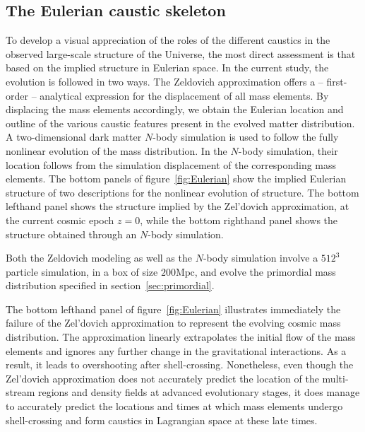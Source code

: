 \documentclass[a4paper, 11pt]{article}
\begin{document}
\subsection{The Eulerian caustic skeleton}
\label{sec:nbody}
To develop a visual appreciation of the roles of the different caustics in the observed large-scale structure of the Universe, the most direct assessment is that based on the implied structure in Eulerian space. In the current study, the evolution is followed in two ways. The Zeldovich approximation offers a -- first-order -- analytical expression for the displacement of all mass elements. By displacing the mass elements accordingly, we obtain the Eulerian location and outline of the various caustic features present in the evolved matter distribution.  A two-dimensional dark matter $N$-body simulation \cite{Hidding:2020} is used to follow the fully nonlinear evolution of the mass distribution. In the $N$-body simulation, their location follows from the simulation displacement of the corresponding mass elements. The bottom panels of figure~\ref{fig:Eulerian} show the implied Eulerian structure of two descriptions for the nonlinear evolution of structure. The bottom lefthand panel shows the structure implied by the Zel'dovich approximation, at the current cosmic epoch $z=0$, while the bottom righthand panel shows the structure
obtained through an $N$-body simulation. 

Both the Zeldovich modeling as well as the $N$-body simulation involve a $512^3$ particle simulation, in a box of size $200 \mbox{Mpc}$, and evolve the primordial mass distribution specified in section~\ref{sec:primordial}. 

The bottom lefthand panel of figure~\ref{fig:Eulerian} illustrates immediately the failure of the Zel'dovich approximation to represent the evolving cosmic mass distribution. The approximation linearly extrapolates the initial flow of the mass elements and ignores any further change in the gravitational interactions. As a result, it leads to overshooting after shell-crossing. Nonetheless, even though the Zel'dovich approximation does not accurately predict the location of the multi-stream regions and density fields at advanced evolutionary stages, it does manage to accurately predict the locations and times at which mass elements undergo shell-crossing and form caustics in Lagrangian space at these late times.
\end{document}
